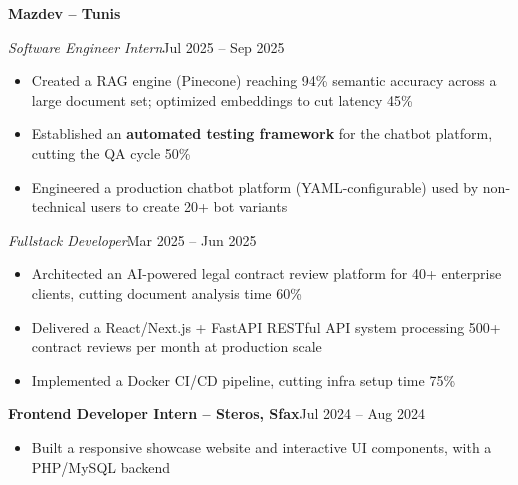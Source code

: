 \documentclass[10pt,a4paper]{article}
\newcommand{\entry}[2]{\vspace{1pt}\noindent\textbf{#1}\hfill{\color{muted}#2}\par}
\newcommand{\subentry}[2]{\noindent\textit{#1}\hfill{\color{muted}#2}\par}
\begin{document}
\entry{Mazdev -- Tunis}{}
\subentry{Software Engineer Intern}{Jul 2025 -- Sep 2025}
\begin{itemize}
  \item Created a RAG engine (Pinecone) reaching 94\% semantic accuracy across a large document set; optimized embeddings to cut latency 45\%
  \item Established an \textbf{automated testing framework} for the chatbot platform, cutting the QA cycle 50\%
  \item Engineered a production chatbot platform (YAML-configurable) used by non-technical users to create 20+ bot variants
\end{itemize}
\subentry{Fullstack Developer}{Mar 2025 -- Jun 2025}
\begin{itemize}
  \item Architected an AI-powered legal contract review platform for 40+ enterprise clients, cutting document analysis time 60\%
  \item Delivered a React/Next.js + FastAPI RESTful API system processing 500+ contract reviews per month at production scale
  \item Implemented a Docker CI/CD pipeline, cutting infra setup time 75\%
\end{itemize}

\entry{Frontend Developer Intern -- Steros, Sfax}{Jul 2024 -- Aug 2024}
\begin{itemize}
  \item Built a responsive showcase website and interactive UI components, with a PHP/MySQL backend
\end{itemize}
\end{document}
